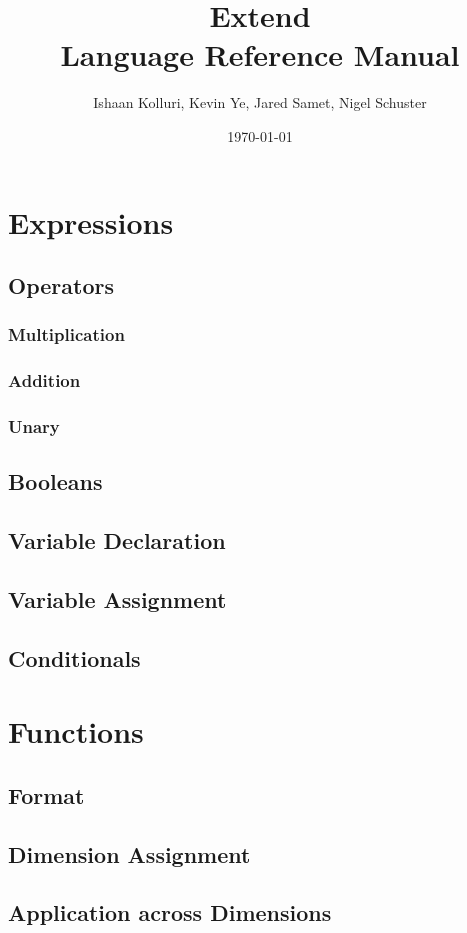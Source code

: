 \documentclass[titlepage]{article}
\title{Extend\\ Language Reference Manual}
\author{Ishaan Kolluri, Kevin Ye, Jared Samet, Nigel Schuster}
\date{\today}
\begin{document}
\maketitle
\tableofcontents

\section{Expressions}
\subsection{Operators}
\subsubsection{Multiplication}
\subsubsection{Addition}
\subsubsection{Unary}
\subsection{Booleans}
\subsection{Variable Declaration}
\subsection{Variable Assignment}
\subsection{Conditionals}
\section{Functions}
\subsection{Format}
\subsection{Dimension Assignment}
\subsection{Application across Dimensions}
\end{document}
